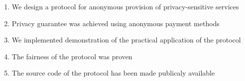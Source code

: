 \documentclass[preprint,3p]{elsarticle}
\begin{document}
\begin{enumerate}
    \item We design a protocol for anonymous provision of privacy-sensitive services
    \item Privacy guarantee was achieved using anonymous payment methods
    \item We implemented demonstration of the practical application of the protocol
    \item The fairness of the protocol was proven
    \item The source code of the protocol has been made publicaly available
\end{enumerate}
       
\end{document}
